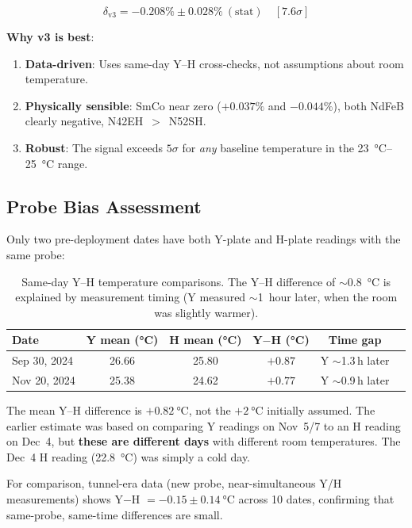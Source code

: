\documentclass[11pt,letterpaper]{article}
\newcommand{\ndfeb}{NdFeB}
\begin{document}
\begin{equation*}
    \delta_\mathrm{v3} = -0.208\% \pm 0.028\%~(\mathrm{stat}) \quad [7.6\sigma]
\end{equation*}

\textbf{Why v3 is best}:
\begin{enumerate}
    \item \textbf{Data-driven}: Uses same-day Y--H cross-checks, not
    assumptions about room temperature.
    \item \textbf{Physically sensible}: SmCo near zero ($+0.037\%$ and
    $-0.044\%$), both \ndfeb{} clearly negative, N42EH~$>$~N52SH.
    \item \textbf{Robust}: The signal exceeds $5\sigma$ for \emph{any}
    baseline temperature in the \SIrange{23}{25}{\celsius} range.
\end{enumerate}

\subsection{Probe Bias Assessment}
\label{sec:probe_bias}

Only two pre-deployment dates have both Y-plate and H-plate readings with the
same probe:

\begin{table}[H]
\centering
\caption{Same-day Y--H temperature comparisons. The Y--H difference of
$\sim$\SI{0.8}{\celsius} is explained by measurement timing (Y measured
$\sim$1~hour later, when the room was slightly warmer).}
\label{tab:probe_bias}
\begin{tabular}{@{}lccccc@{}}
\toprule
\textbf{Date} & Y mean (\si{\celsius}) & H mean (\si{\celsius}) & Y$-$H (\si{\celsius}) & Time gap \\
\midrule
Sep 30, 2024 & 26.66 & 25.80 & $+0.87$ & Y $\sim$1.3\,h later \\
Nov 20, 2024 & 25.38 & 24.62 & $+0.77$ & Y $\sim$0.9\,h later \\
\bottomrule
\end{tabular}
\end{table}

The mean Y--H difference is $+\SI{0.82}{\celsius}$, not the $+\SI{2}{\celsius}$
initially assumed. The earlier estimate was based on comparing Y readings on
Nov~5/7 to an H reading on Dec~4, but \textbf{these are different days} with
different room temperatures. The Dec~4 H reading (\SI{22.8}{\celsius}) was
simply a cold day.

For comparison, tunnel-era data (new probe, near-simultaneous Y/H measurements)
shows Y$-$H $= -0.15\pm\SI{0.14}{\celsius}$ across 10 dates, confirming that
same-probe, same-time differences are small.
\end{document}

